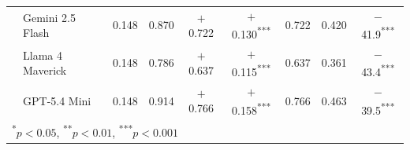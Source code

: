 \begin{table}[t]
\begin{tabular}{llccccccc}
 & Gemini 2.5 Flash     & 0.148 & 0.870 & $+$0.722 & $+$0.130\textsuperscript{***} & 0.722 & 0.420 & $-$41.9\textsuperscript{***} \\
 & Llama 4 Maverick     & 0.148 & 0.786 & $+$0.637 & $+$0.115\textsuperscript{***} & 0.637 & 0.361 & $-$43.4\textsuperscript{***} \\
 & GPT-5.4 Mini         & 0.148 & 0.914 & $+$0.766 & $+$0.158\textsuperscript{***} & 0.766 & 0.463 & $-$39.5\textsuperscript{***} \\
\bottomrule
\multicolumn{9}{l}{\footnotesize \textsuperscript{*}$p<0.05$, \textsuperscript{**}$p<0.01$, \textsuperscript{***}$p<0.001$} \\
\end{tabular}
\end{table}